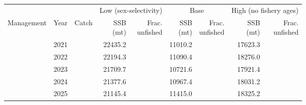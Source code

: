 \begin{table}
\centering
\begin{tabular}[t]{>{}l|l>{}rr>{}r|rrrr}
\toprule
\multicolumn{1}{c}{ } & \multicolumn{1}{c}{ } & \multicolumn{1}{c}{ } & \multicolumn{2}{c}{Low (sex-selectivity)} & \multicolumn{2}{c}{Base} & \multicolumn{2}{c}{High (no fishery ages)} \\
\cmidrule(l{3pt}r{3pt}){4-5} \cmidrule(l{3pt}r{3pt}){6-7} \cmidrule(l{3pt}r{3pt}){8-9}
Management & Year & Catch & \makecell{SSB\\(mt)} & \makecell{Frac.\\unfished} & \makecell{SSB\\(mt)} & \makecell{Frac.\\unfished} & \makecell{SSB\\(mt)} & \makecell{Frac.\\unfished}\\
\midrule
 & 2021 & \cellcolor[HTML]{B0A473}{\textcolor{white}{1200.100}} & 22435.2 & \cellcolor[HTML]{2B748E}{\textcolor{white}{0.614}} & 11010.2 & \cellcolor[HTML]{2E6E8E}{\textcolor{white}{0.642}} & 17623.3 & \cellcolor[HTML]{375B8D}{\textcolor{white}{0.719}}\\

 & 2022 & \cellcolor[HTML]{B0A473}{\textcolor{white}{1200.100}} & 22194.3 & \cellcolor[HTML]{2A768E}{\textcolor{white}{0.608}} & 11090.4 & \cellcolor[HTML]{2E6D8E}{\textcolor{white}{0.646}} & 18276.0 & \cellcolor[HTML]{3A538B}{\textcolor{white}{0.746}}\\

 & 2023 & \cellcolor[HTML]{B0A473}{\textcolor{white}{1200.100}} & 21709.7 & \cellcolor[HTML]{29798E}{\textcolor{white}{0.595}} & 10721.6 & \cellcolor[HTML]{2C728E}{\textcolor{white}{0.625}} & 17921.4 & \cellcolor[HTML]{38588C}{\textcolor{white}{0.731}}\\

 & 2024 & \cellcolor[HTML]{B0A473}{\textcolor{white}{1200.100}} & 21377.6 & \cellcolor[HTML]{287C8E}{\textcolor{white}{0.585}} & 10967.4 & \cellcolor[HTML]{2E6F8E}{\textcolor{white}{0.639}} & 18031.2 & \cellcolor[HTML]{39558C}{\textcolor{white}{0.736}}\\

 & 2025 & \cellcolor[HTML]{B0A473}{\textcolor{white}{1200.100}} & 21145.4 & \cellcolor[HTML]{287D8E}{\textcolor{white}{0.579}} & 11415.0 & \cellcolor[HTML]{31688E}{\textcolor{white}{0.665}} & 18325.2 & \cellcolor[HTML]{3B528B}{\textcolor{white}{0.748}}\\


\end{tabular}
\end{table}
